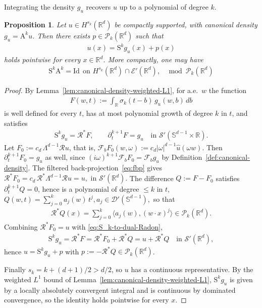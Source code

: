 \documentclass[12pt]{article}
\numberwithin{equation}{section}
\newtheorem{proposition}{Proposition}[section]
\numberwithin{figure}{section}
\numberwithin{equation}{section}
\newcommand{\R}{\mathbb{R}}
\newcommand{\Sph}{\mathbb S}
\newcommand{\abs}[1]{\left|#1\right|}
\begin{document}
Integrating the density $g_u$ recovers $u$ up to a polynomial of degree $k$.
\begin{proposition}
\label{prop:density-to-function}
Let $u\in H^{s_k}(\R^d)$ be compactly supported, with canonical density $g_u = \mathrm{A}^k  u$.
Then there exists $p\in\mathcal P_k(\R^d)$ such that
\begin{align*}
    u(x)=\mathrm{S}^k g_u(x)+p(x)
\end{align*}
holds pointwise for every $x\in\R^d$. More compactly, one may have
\begin{align*}
    \mathrm{S}^k\mathrm{A}^k=\mathrm{Id}\ \ 
    \text{on }H^{s_k}(\mathbb{R}^d)\cap\mathcal E'(\mathbb{R}^d),\ \ 
    \mod \mathcal{P}_k(\mathbb{R}^d)
\end{align*}
\end{proposition}
\begin{proof}
By Lemma~\ref{lem:canonical-density-weighted-L1}, for a.e.\ $w$ the function
\begin{align*}
    F(w,t):=\int_\R \sigma_k(t-b)\,g_u(w,b)\,db
\end{align*}
is well defined for every $t$, has at most polynomial growth of degree $k$ in
$t$, and satisfies
\begin{align}
    \mathrm{S}^k g_u=\mathcal R^*F,
    \qquad
    \partial_t^{k+1}F=g_u
    \quad\text{in }\mathcal S'(\Sph^{d-1}\times\R).
    \label{eq:S_k-to-dual-Radon}
\end{align}
Let $F_0:=c_d\,\Lambda^{d-1}\mathcal Ru$, that is,
$\mathcal F_bF_0(w,\omega):=c_d\abs{\omega}^{d-1}\widehat u(\omega w)$. Then
$\partial_t^{k+1}F_0=g_u$ as well, since
$(i\omega)^{k+1}\mathcal F_bF_0=\mathcal F_bg_u$ by
Definition~\ref{def:canonical-density}. The filtered back-projection~\eqref{eq:fbp} gives
$\mathcal R^*F_0=c_d\,\mathcal R^*\Lambda^{d-1}\mathcal Ru=u,\text{ in }\mathcal S'(\R^d).$
The difference $Q:=F-F_0$ satisfies $\partial_t^{k+1}Q=0$, hence is a
polynomial of degree $\le k$ in $t$,
$Q(w,t)=\sum_{j=0}^k a_j(w)\,t^j, a_j\in\mathcal D'(\Sph^{d-1}),$
so that
\begin{align*}
    \mathcal R^*Q(x)
    =\sum_{j=0}^k \langle a_j(w),(w\cdot x)^j\rangle
    \in\mathcal P_k(\R^d).
\end{align*}
Combining $\mathcal R^*F_0=u$ with \eqref{eq:S_k-to-dual-Radon},
\begin{align*}
    \mathrm{S}^k g_u=\mathcal R^*F=\mathcal R^*F_0+\mathcal R^*Q=u+\mathcal R^*Q
    \quad\text{in }\mathcal S'(\R^d),
\end{align*}
hence $u=\mathrm{S}^k g_u+p$ with $p:=-\mathcal R^*Q\in\mathcal P_k(\R^d)$.

Finally $s_k=k+(d+1)/2>d/2$, so $u$ has a continuous representative. By the
weighted $L^1$ bound of Lemma~\ref{lem:canonical-density-weighted-L1}, $\mathrm{S}^k g_u$
is given by a locally absolutely convergent integral and is continuous by dominated
convergence, so the identity holds pointwise for every $x$.
\end{proof}
\end{document}
